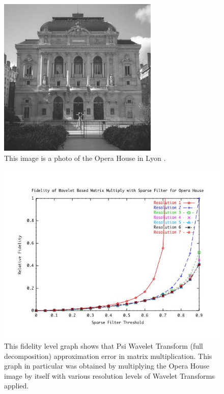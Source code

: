 \begin{figure}
\begin{center}\includegraphics [width=3in] {opera.jpg}\end{center}
\caption {This image is a photo of the Opera House in Lyon \cite{opera}.}
\label{operahouse}
\end{figure}

\begin{figure}[ht]
\begin{center}\includegraphics [width=5in]{operaresultsA.jpg}\end{center}
\caption{This fidelity level graph shows that Psi Wavelet Transform (full decomposition) approximation error in matrix multiplication.  This graph in particular was obtained by multiplying the Opera House image by itself with various resolution levels of Wavelet Transforms applied.    }
\label{imageoperaFidelity}
\end{figure}

